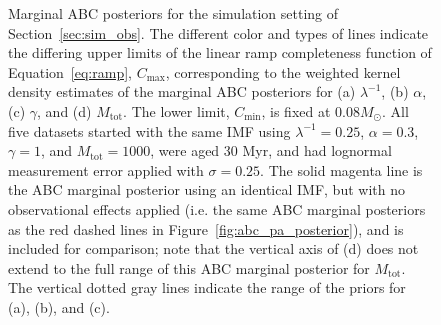 \documentclass[ejs]{imsart}
\numberwithin{equation}{section}
\theoremstyle{plain}
\newcommand{\Msun}{M_{\odot}}
\newcommand{\Cmin}{C_{\text{min}}}
\newcommand{\Cmax}{C_{\text{max}}}
\newcommand{\Mtot}{M_{\text{tot}}}
\begin{document}
\begin{figure}[htbp]
\begin{subfigure}{0.48\textwidth}
\end{subfigure}
%
 \caption{Marginal ABC posteriors for the simulation setting of Section~\ref{sec:sim_obs}.  The different color and types of lines indicate the differing upper limits of the linear ramp completeness function of Equation~\eqref{eq:ramp}, $\Cmax$, corresponding to the weighted kernel density estimates of the marginal ABC posteriors for (a) $\lambda^{-1}$, (b) $\alpha$, (c) $\gamma$, and (d) $\Mtot$.  
The lower limit, $\Cmin$, is fixed at 0.08$\Msun$.  
All five datasets started with the same IMF using $\lambda^{-1} = 0.25$, $\alpha = 0.3$, $\gamma = 1$, and $\Mtot = 1000$, were aged 30 Myr, and had lognormal measurement error applied with $\sigma = 0.25$.
The solid magenta line is the ABC marginal posterior using an identical IMF, but with no observational effects applied (i.e. the same ABC marginal posteriors as the red dashed lines in Figure~\ref{fig:abc_pa_posterior}), and is included for comparison; note that the vertical axis of (d) does not extend to the full range of this ABC marginal posterior for $\Mtot$.
The vertical dotted gray lines indicate the range of the priors for (a), (b), and (c).
   }
   \label{fig:abc_pa_posterior_obs}
\end{figure}
\end{document}
